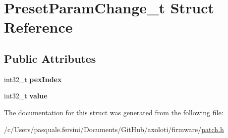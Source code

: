 \hypertarget{structPresetParamChange__t}{}\section{Preset\+Param\+Change\+\_\+t Struct Reference}
\label{structPresetParamChange__t}
\subsection*{Public Attributes}
\begin{DoxyCompactItemize}
\item 
int32\+\_\+t {\bfseries pex\+Index}
\item 
int32\+\_\+t {\bfseries value}
\end{DoxyCompactItemize}


The documentation for this struct was generated from the following file\+:\begin{DoxyCompactItemize}
\item 
/c/\+Users/pasquale.\+fersini/\+Documents/\+Git\+Hub/axoloti/firmware/\hyperlink{patch_8h}{patch.\+h}\end{DoxyCompactItemize}
